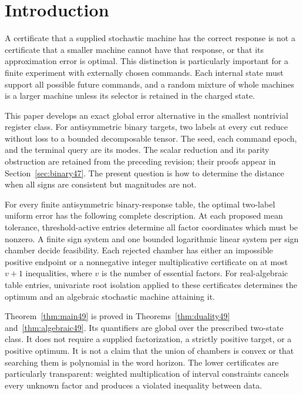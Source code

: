 \section{Introduction}
A certificate that a supplied stochastic machine has the correct
response is not a certificate that a smaller machine cannot have that
response, or that its approximation error is optimal. This distinction
is particularly important for a finite experiment with externally
chosen commands. Each internal state must support all possible future
commands, and a random mixture of whole machines is a larger machine
unless its selector is retained in the charged state.

This paper develops an exact global error alternative in the
smallest nontrivial register class. For antisymmetric binary targets,
two labels at every cut reduce without loss to a bounded decomposable
tensor. The seed, each command epoch, and the terminal query are its
modes. The scalar reduction and its parity obstruction are retained
from the preceding revision; their proofs appear in
Section~\ref{sec:binary47}. The present question is how to determine
the distance when all signs are consistent but magnitudes are not.

\begin{theorem}\label{thm:main49}
For every finite antisymmetric binary-response table, the optimal
two-label uniform error has the following complete description.
At each proposed mean tolerance, threshold-active entries determine
all factor coordinates which must be nonzero. A finite sign system
and one bounded logarithmic linear system per sign chamber decide
feasibility. Each rejected chamber has either an impossible positive
endpoint or a nonnegative integer multiplicative certificate on at
most $v+1$ inequalities, where $v$ is the number of essential factors.
For real-algebraic table entries, univariate root isolation applied
to these certificates determines the optimum and an algebraic
stochastic machine attaining it.
\end{theorem}

Theorem~\ref{thm:main49} is proved in
Theorems~\ref{thm:duality49} and~\ref{thm:algebraic49}.
Its quantifiers are global over the prescribed two-state class.
It does not require a supplied factorization, a strictly positive
target, or a positive optimum. It is not a claim that the union of
chambers is convex or that searching them is polynomial in the word
horizon. The lower certificates are particularly transparent:
weighted multiplication of interval constraints cancels every
unknown factor and produces a violated inequality between data.

